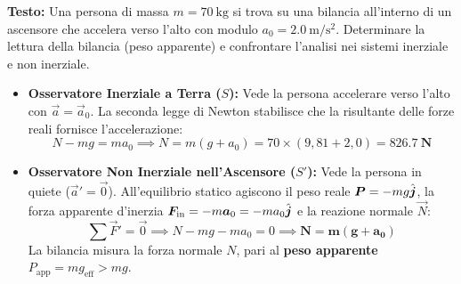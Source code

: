 \begin{esercizio}
\textbf{Testo:}
Una persona di massa $m = \SI{70}{\kilogram}$ si trova su una bilancia all'interno di un ascensore che accelera verso l'alto con modulo $a_0 = \SI{2.0}{\metre\per\second\squared}$. Determinare la lettura della bilancia (peso apparente) e confrontare l'analisi nei sistemi inerziale e non inerziale.
\end{esercizio}

\begin{center}
\end{center}

\begin{tcolorbox}[enhanced, breakable, colback=forestgreen!5!white, colframe=forestgreen!80!black,
    title={\textbf{Confronto tra Sistema Inerziale e Riferimento Non Inerziale}}, fonttitle=\bfseries\sffamily]
\begin{itemize}
    \item \textbf{Osservatore Inerziale a Terra ($S$):}
    Vede la persona accelerare verso l'alto con $\vec{a} = \vec{a}_0$. La seconda legge di Newton stabilisce che la risultante delle forze reali fornisce l'accelerazione:
    \begin{equation}
        N - mg = m a_0 \implies N = m(g + a_0) = 70 \times (9{,}81 + 2{,}0) = \mathbf{\SI{826.7}{\newton}}
    \end{equation}
    \item \textbf{Osservatore Non Inerziale nell'Ascensore ($S'$):}
    Vede la persona in quiete ($\vec{a}' = \vec{0}$). All'equilibrio statico agiscono il peso reale $\bm{P} = -mg\hat{\bm{j}}$, la forza apparente d'inerzia $\bm{F}_{\text{in}} = -m\bm{a}_0 = -m a_0\hat{\bm{j}}$ e la reazione normale $\vec{N}$:
    \begin{equation}
        \sum \vec{F}' = \vec{0} \implies N - mg - m a_0 = 0 \implies \mathbf{N = m(g + a_0)}
    \end{equation}
    La bilancia misura la forza normale $N$, pari al \textbf{peso apparente} $P_{\text{app}} = m g_{\text{eff}} > mg$.
\end{itemize}
\end{tcolorbox}
